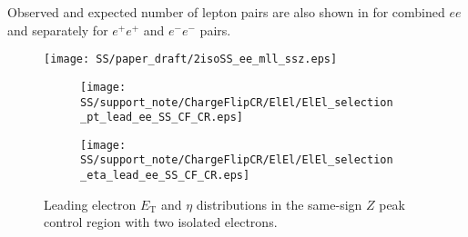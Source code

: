 Observed and expected number of lepton pairs are also shown in  for combined $ee$ and separately for $e^{+}e^{+}$ and $e^{-}e^{-}$ pairs.

\begin{figure}[h]
\begin{center}
\texttt{[image: SS/paper\_draft/2isoSS\_ee\_mll\_ssz.eps]}
\caption{\toDo}
\label{fig:charge_flip_CR_inv_mass}
\end{center}
\end{figure} 

\begin{figure}
\begin{subfigure}{.5\textwidth}
  \centering
  \texttt{[image: SS/support\_note/ChargeFlipCR/ElEl/ElEl\_selection\_pt\_lead\_ee\_SS\_CF\_CR.eps]}
\end{subfigure}%
\begin{subfigure}{.5\textwidth}
  \centering
  \texttt{[image: SS/support\_note/ChargeFlipCR/ElEl/ElEl\_selection\_eta\_lead\_ee\_SS\_CF\_CR.eps]}
\end{subfigure}
\caption{\toDo Leading electron $E_\mathrm{T}$ and $\eta$ distributions in the same-sign $Z$ peak control region with two isolated electrons.}
  \label{fig:charge_flip_CR_kinematics}
\end{figure}


